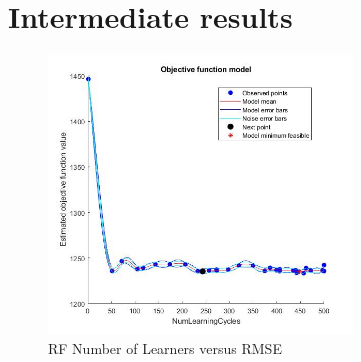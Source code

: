 \documentclass[a4paper,12pt]{article}
\begin{document}
\section{Intermediate results}

\begin{figure}[!htb] %
\centering
\includegraphics[height=7.38cm]{img/RFNumLearCyclesVMinMRSE}
\caption{RF Number of Learners versus RMSE}
\end{figure}
\end{document}
